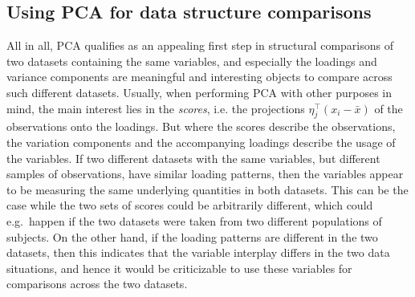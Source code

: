 \documentclass[titlepage,11pt,twoside]{article}
\begin{document}
\subsection{Using PCA for data structure comparisons}
All in all, PCA qualifies as an appealing first step in structural comparisons of two datasets containing the same variables, and especially the loadings and variance components are meaningful and interesting objects to compare across such different datasets. Usually, when performing PCA with other purposes in mind, the main interest lies in the \textit{scores}, i.e. the projections $\eta_j^\top (x_i - \bar{x})$ of the observations onto the loadings. But where the scores describe the observations, the variation components and the accompanying loadings describe the usage of the variables. If two different datasets with the same variables, but different samples of observations, have similar loading patterns, then the variables appear to be measuring the same underlying quantities in both datasets. This can be the case while the two sets of scores could be arbitrarily different, which could e.g.\ happen if the two datasets were taken from two different populations of subjects. On the other hand, if the loading patterns are different in the two datasets, then this indicates that the variable interplay differs in the two data situations, and hence it would be criticizable to use these variables for comparisons across the two datasets.
\end{document}
